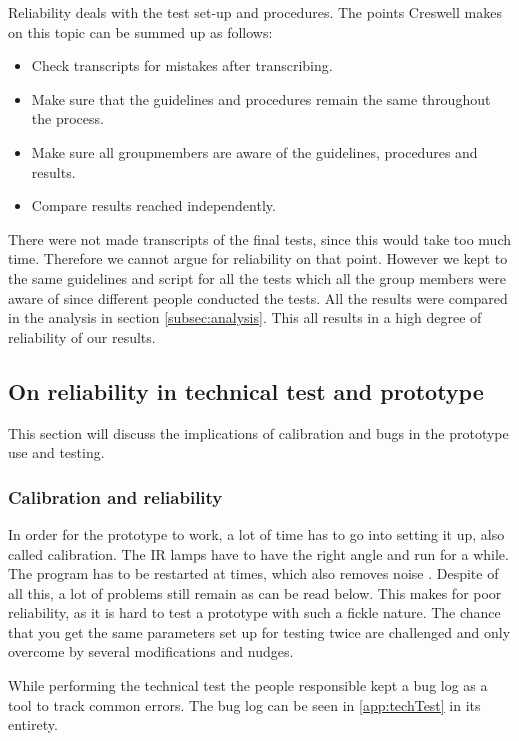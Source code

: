 Reliability deals with the test set-up and procedures. The points Creswell \citep{Creswell} makes on this topic can be summed up as follows:

\begin{itemize}
\item Check transcripts for mistakes after transcribing.
\item Make sure that the guidelines and procedures remain the same throughout the process.
\item Make sure all groupmembers are aware of the guidelines, procedures and results. 
\item Compare results reached independently.
\end{itemize}

There were not made transcripts of the final tests, since this would take too much time. Therefore we cannot argue for reliability on that point. However we kept to the same guidelines and script for all the tests which all the group members were aware of since different people conducted the tests. All the results were compared in the analysis in section \ref{subsec:analysis}. This all results in a high degree of reliability of our results. 

\subsection{On reliability in technical test and prototype}
This section will discuss the implications of calibration and bugs in the prototype use and testing. 
\subsubsection*{Calibration and reliability}
In order for the prototype to work, a lot of time has to go into setting it up, also called calibration. The IR lamps have to have the right angle and run for a while. The program has to be restarted at times, which also removes noise . Despite of all this, a lot of problems still remain as can be read below. This makes for poor reliability, as it is hard to test a prototype with such a fickle nature. The chance that you get the same parameters set up for testing twice are challenged and only overcome by several modifications and nudges.

While performing the technical test the people responsible kept a bug log as a tool to track common errors. The bug log can be seen in \ref{app:techTest}  in its entirety.

